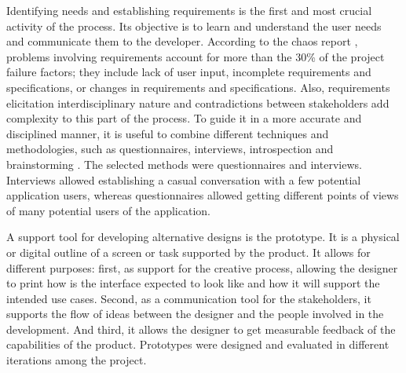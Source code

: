 Identifying needs and establishing requirements is the first and most crucial activity of the process. Its objective is to learn and understand the user needs and communicate them to the developer. According to the chaos report \cite{Group1994}, problems involving requirements account for more than the 30\% of the project failure factors; they include lack of user input, incomplete requirements and specifications, or changes in requirements and specifications. Also, requirements elicitation interdisciplinary nature and contradictions between stakeholders add complexity to this part of the process. To guide it in a more accurate and disciplined manner, it is useful to combine different techniques and methodologies, such as questionnaires, interviews, introspection and brainstorming \cite{Coulin2005}. The selected methods were questionnaires and interviews. Interviews allowed establishing a casual conversation with a few potential application users, whereas questionnaires allowed getting different points of views of many potential users of the application. 

A support tool for developing alternative designs is the prototype. It is a physical or digital outline of a screen or task supported by the product. It allows for different purposes: first, as support for the creative process, allowing the designer to print how is the interface expected to look like and how it will support the intended use cases. Second, as a communication tool for the stakeholders, it supports the flow of ideas between the designer and the people involved in the development. And third, it allows the designer to get measurable feedback of the capabilities of the product. Prototypes were designed and evaluated in different iterations among the project.